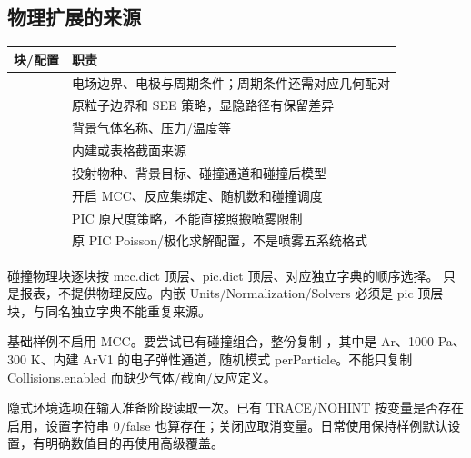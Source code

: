 \documentclass[a4paper,11pt]{article}
\begin{document}
\subsection{物理扩展的来源}
\begin{longtable}{L{.28\linewidth}L{.64\linewidth}}
\toprule 块/配置 & 职责 \\\midrule\endhead
{} & 电场边界、电极与周期条件；周期条件还需对应几何配对 \\
 & 原粒子边界和 SEE 策略，显隐路径有保留差异 \\
 & 背景气体名称、压力/温度等 \\
 & 内建或表格截面来源 \\
 & 投射物种、背景目标、碰撞通道和碰撞后模型 \\
 & 开启 MCC、反应集绑定、随机数和碰撞调度 \\
 & PIC 原尺度策略，不能直接照搬喷雾限制 \\
 & 原 PIC Poisson/极化求解配置，不是喷雾五系统格式 \\
\bottomrule
\end{longtable}
碰撞物理块逐块按 mcc.dict 顶层、pic.dict 顶层、对应独立字典的顺序选择。 只是报表，不提供物理反应。内嵌 Units/Normalization/Solvers 必须是 pic 顶层块，与同名独立字典不能重复来源。

基础样例不启用 MCC。要尝试已有碰撞组合，整份复制 ，其中是 Ar、1000 Pa、300 K、内建 ArV1 的电子弹性通道，随机模式 perParticle。不能只复制 Collisions.enabled 而缺少气体/截面/反应定义。

隐式环境选项在输入准备阶段读取一次。已有 TRACE/NOHINT 按变量是否存在启用，设置字符串 0/false 也算存在；关闭应取消变量。日常使用保持样例默认设置，有明确数值目的再使用高级覆盖。
\end{document}
